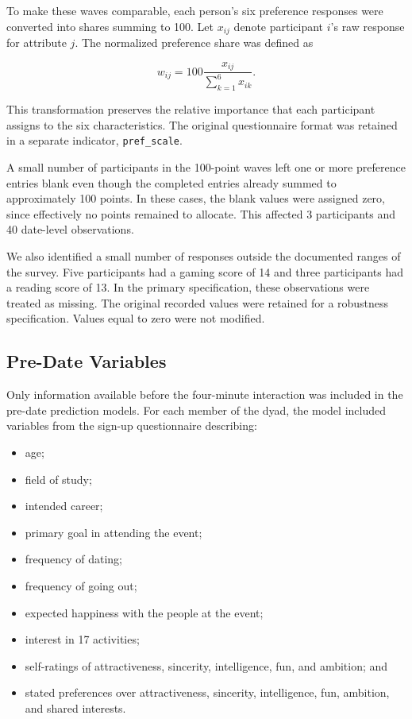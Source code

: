 \documentclass[11pt,letterpaper,reqno]{amsart}
\numberwithin{equation}{subsection}
\theoremstyle{definition}
\numberwithin{thm}{subsection}
\begin{document}
To make these waves comparable, each person's six preference responses were converted into shares summing to 100. Let $x_{ij}$ denote participant $i$'s raw response for attribute $j$. The normalized preference share was defined as

\begin{equation}
w_{ij}
=
100
\frac{x_{ij}}
{\sum_{k=1}^{6} x_{ik}}.
\end{equation}

This transformation preserves the relative importance that each participant assigns to the six characteristics. The original questionnaire format was retained in a separate indicator, \texttt{pref\_scale}.

A small number of participants in the 100-point waves left one or more preference entries blank even though the completed entries already summed to approximately 100 points. In these cases, the blank values were assigned zero, since effectively no points remained to allocate. This affected 3 participants and 40 date-level observations.

We also identified a small number of responses outside the documented ranges of the survey. Five participants had a gaming score of 14 and three participants had a reading score of 13. In the primary specification, these observations were treated as missing. The original recorded values were retained for a robustness specification. Values equal to zero were not modified.

\subsection{Pre-Date Variables}
Only information available before the four-minute interaction was included in the pre-date prediction models. For each member of the dyad, the model included variables from the sign-up questionnaire describing:

\begin{itemize}
    \item age;
    \item field of study;
    \item intended career;
    \item primary goal in attending the event;
    \item frequency of dating;
    \item frequency of going out;
    \item expected happiness with the people at the event;
    \item interest in 17 activities;
    \item self-ratings of attractiveness, sincerity, intelligence, fun, and ambition; and
    \item stated preferences over attractiveness, sincerity, intelligence, fun, ambition, and shared interests.
\end{itemize}
\end{document}
